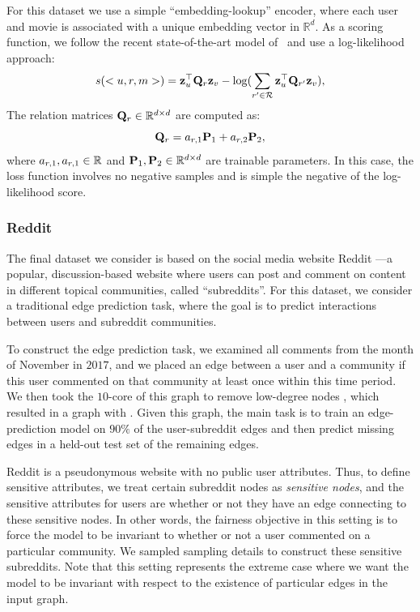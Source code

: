 For this dataset we use a simple ``embedding-lookup'' encoder, where each user and movie is associated with a unique embedding vector in $\mathbb{R}^d$.
As a scoring function, we follow the recent state-of-the-art model of \CITE\ and use a  log-likelihood approach:
\begin{equation*}
    s(<u, r, m>) = \mathbf{z}_u^\top\mathbf{Q}_r\mathbf{z}_v-\log(\sum_{r' \in \mathcal{R}}\mathbf{z}_u^\top\mathbf{Q}_{r'}\mathbf{z}_v),
\end{equation*}
The relation matrices $\mathbf{Q}_r \in \mathbb{R}^{d \times d}$ are computed as:
\begin{equation*}
    \mathbf{Q}_r = a_{r, 1}\mathbf{P}_1 + a_{r,2}\mathbf{P}_2, 
\end{equation*}
where $a_{r, 1}, a_{r, 1} \in \mathbb{R}$ and $\mathbf{P}_1, \mathbf{P}_2 \in \mathbb{R}^{d \times d}$ are trainable parameters. 
In this case, the loss function involves no negative samples and is simple the negative of the log-likelihood score. 

\subsubsection{Reddit}

The final dataset we consider is based on the social media website Reddit \CITE---a popular, discussion-based website where users can post and comment on content in different topical communities, called ``subreddits''. 
For this dataset, we consider a traditional edge prediction task, where the goal is to predict interactions between users and subreddit communities. 

To construct the edge prediction task, we examined all comments from the month of November in $2017$, and we placed an edge between a user and a community if this user commented on that community at least once within this time period. 
We then took the $10$-core \CITE of this graph to remove low-degree nodes \CITE, which resulted in a graph with .
Given this graph, the main task is to train an edge-prediction model on $90\%$ of the user-subreddit edges and then predict missing edges in a held-out test set of the remaining edges.  

Reddit is a pseudonymous website with no public user attributes.  
Thus, to define sensitive attributes, we treat certain subreddit nodes as {\em sensitive nodes}, and the sensitive attributes for users are whether or not they have an edge connecting to these sensitive nodes.
In other words, the fairness objective in this setting is to force the model to be invariant to whether or not a user commented on a particular community. 
We sampled {\red sampling details} to construct these sensitive subreddits.
Note that this setting represents the extreme case where we want the model to be invariant with respect to the existence of particular edges in the input graph. 

